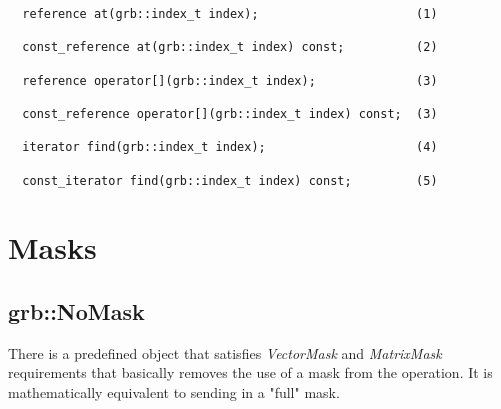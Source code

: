 \begin{verbatim}
  reference at(grb::index_t index);                      (1)

  const_reference at(grb::index_t index) const;          (2)

  reference operator[](grb::index_t index);              (3)

  const_reference operator[](grb::index_t index) const;  (3)

  iterator find(grb::index_t index);                     (4)

  const_iterator find(grb::index_t index) const;         (5)
\end{verbatim}


\section{Masks}
\label{Sec:Masks}



\subsection{\sf grb::NoMask}

There is a predefined object that satisfies \textit{VectorMask} and \textit{MatrixMask}
requirements that basically removes the use of a mask from the operation. It
is mathematically equivalent to sending in a "full" mask.
